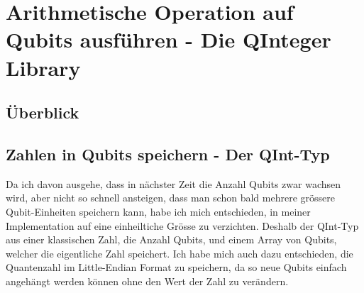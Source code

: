 \chapter{Arithmetische Operation auf Qubits ausführen - Die QInteger Library}
\section{Überblick}

\section{Zahlen in Qubits speichern - Der QInt-Typ}
Da ich davon ausgehe, dass in nächster Zeit die Anzahl Qubits zwar wachsen wird, aber nicht so schnell ansteigen, dass man schon bald mehrere grössere Qubit-Einheiten speichern kann, habe ich mich entschieden, in meiner Implementation auf eine einheiltiche Grösse zu verzichten. Deshalb der QInt-Typ aus einer klassischen Zahl, die Anzahl Qubits, und einem Array von Qubits, welcher die eigentliche Zahl speichert. Ich habe mich auch dazu entschieden, die Quantenzahl im Little-Endian Format zu speichern, da so neue Qubits einfach angehängt werden können ohne den Wert der Zahl zu verändern. 



